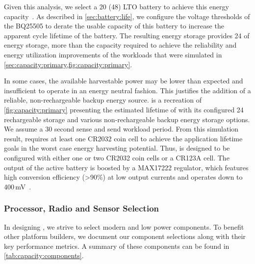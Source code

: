Given this analysis, we select a 20\ssi{\milli\Ah} (48\ssi{\milli\Wh}) LTO battery 
to achieve this energy capacity~\cite{LTODatasheet, LTODatasheet2}.
As described in \cref{sec:battery:life},
we configure the voltage thresholds of the BQ25505 to derate the 
usable capacity of this battery to  
increase the apparent cycle lifetime of the battery. 
The resulting energy storage provides 24\ssi{\milli\Wh} of
energy storage, more than the capacity required to achieve the reliability and energy utilization
improvements of the workloads that were simulated in \cref{sec:capacity:primary,fig:capacity:primary}.

In some cases, the available harvestable power may be lower than expected and insufficient to operate in an energy neutral fashion. 
This justifies the addition of a reliable, non-rechargeable backup energy source.
 is a recreation of \cref{fig:capacity:primary} presenting the estimated lifetime of \name with its configured 24\ssi{\micro\Wh} rechargeable storage and various non-rechargeable backup energy storage options. We assume a 30 second sense and send workload period.
From this simulation result, \name requires at least one CR2032 coin cell to achieve the application lifetime goals in the worst case energy harvesting potential.
Thus, \name is designed to be configured with either one or two CR2032 coin
cells or a CR123A cell. 
The output of the active battery
is boosted by a MAX17222 regulator, which features high conversion efficiency
(>90\%) at low output currents and operates down to 400\,mV~\cite{max17222}.

\subsubsection{Processor, Radio and Sensor Selection}
In designing \name, we strive to select modern and low power components.
To benefit other
platform builders, we document our component selections
along with their key performance metrics. A summary of these
components can be found in \cref{tab:capacity:components}.

